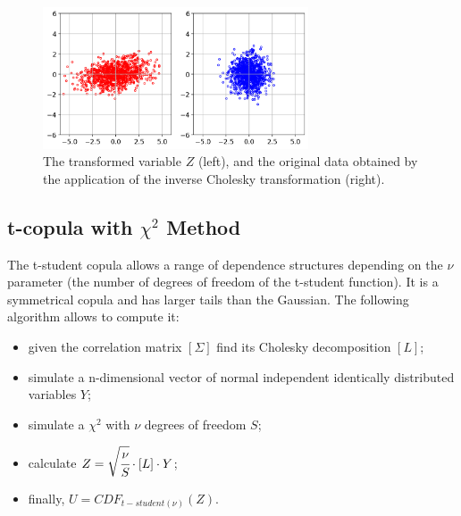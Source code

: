 \begin{figure}[htbp]
\centering
\includegraphics[width=0.7\textwidth]{figures/cholesky_inv}
\caption{The transformed variable $Z$ (left), and the original data obtained by the application of the inverse Cholesky transformation (right).}
\label{fig:cholesky_inv}
\end{figure}

\subsection{t-copula with $\chi^2$ Method}
\label{sec:t-student_copula}
The t-student copula allows a range of dependence structures depending
on the $\nu$ parameter (the number of degrees of freedom of the t-student function).
It is a symmetrical copula and has larger tails than the Gaussian. The following algorithm allows to compute it:
\begin{itemize}
\item given the correlation matrix $[\Sigma]$ find its Cholesky decomposition $[L]$;
\item simulate a n-dimensional vector of normal independent identically distributed variables $Y$;
\item simulate a $\chi^2$ with $\nu$ degrees of freedom $S$;
\item calculate $Z = \sqrt{\cfrac{\nu}{S}}\cdot [L] \cdot Y$;
\item finally, $U = CDF_{t-student(\nu)}(Z)$.
\end{itemize}


